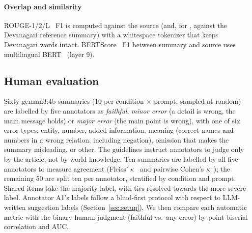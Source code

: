 \paragraph{Overlap and similarity}
ROUGE-1/2/L~\cite{lin2004rouge} F1 is computed against the source (and, for , against the Devanagari reference summary) with a whitespace tokenizer that keeps Devanagari words intact. BERTScore~\cite{zhang2020bertscore} F1 between summary and source uses multilingual BERT~\cite{devlin2019bert} (layer 9).

\subsection{Human evaluation}
Sixty gemma3:4b summaries (10 per condition $\times$ prompt, sampled at random) are labelled by five annotators as \emph{faithful}, \emph{minor error} (a detail is wrong, the main message holds) or \emph{major error} (the main point is wrong), with one of six error types: entity, number, added information, meaning (correct names and numbers in a wrong relation, including negation), omission that makes the summary misleading, or other. The guidelines instruct annotators to judge only by the article, not by world knowledge. Ten summaries are labelled by all five annotators to measure agreement (Fleiss' $\kappa$~\cite{fleiss1971measuring} and pairwise Cohen's $\kappa$~\cite{cohen1960coefficient}); the remaining 50 are split ten per annotator, stratified by condition and prompt. Shared items take the majority label, with ties resolved towards the more severe label. Annotator A1's labels follow a blind-first protocol with respect to LLM-written suggestion labels (Section~\ref{sec:setup}). We then compare each automatic metric with the binary human judgment (faithful vs.\ any error) by point-biserial correlation and AUC.
